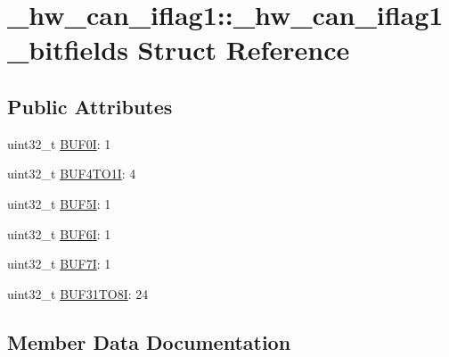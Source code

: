 \hypertarget{struct__hw__can__iflag1_1_1__hw__can__iflag1__bitfields}{}\section{\+\_\+hw\+\_\+can\+\_\+iflag1\+:\+:\+\_\+hw\+\_\+can\+\_\+iflag1\+\_\+bitfields Struct Reference}
\label{struct__hw__can__iflag1_1_1__hw__can__iflag1__bitfields}
\subsection*{Public Attributes}
\begin{DoxyCompactItemize}
\item 
uint32\+\_\+t \hyperlink{struct__hw__can__iflag1_1_1__hw__can__iflag1__bitfields_ac49a5c5a50a13bf40cc8b0994a51e421}{B\+U\+F0I}\+: 1
\item 
uint32\+\_\+t \hyperlink{struct__hw__can__iflag1_1_1__hw__can__iflag1__bitfields_a2e61d0e5e4c1a77b679376b7a72b6e86}{B\+U\+F4\+T\+O1I}\+: 4
\item 
uint32\+\_\+t \hyperlink{struct__hw__can__iflag1_1_1__hw__can__iflag1__bitfields_aac642d250aea73cc3b99a668944d2419}{B\+U\+F5I}\+: 1
\item 
uint32\+\_\+t \hyperlink{struct__hw__can__iflag1_1_1__hw__can__iflag1__bitfields_a9b41e9b95be928618997853b5f8d5b04}{B\+U\+F6I}\+: 1
\item 
uint32\+\_\+t \hyperlink{struct__hw__can__iflag1_1_1__hw__can__iflag1__bitfields_a298c0f09857f0b8352efe33fad5b69e8}{B\+U\+F7I}\+: 1
\item 
uint32\+\_\+t \hyperlink{struct__hw__can__iflag1_1_1__hw__can__iflag1__bitfields_a3dc18c4d7a88c50830f99c0a7193aab1}{B\+U\+F31\+T\+O8I}\+: 24
\end{DoxyCompactItemize}


\subsection{Member Data Documentation}
